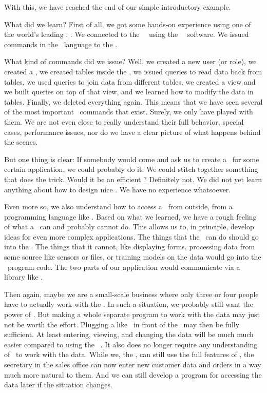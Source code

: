%
%
%
With this, we have reached the end of our simple introductory example.

What did we learn?
First of all, we got some hands-on experience using one of the world's leading \dbms, \postgresql.
We connected to the \postgresql\ \server\ using the \psql\ \client\ software.
We issued commands in the \sql\ language to the \dbms.

What kind of commands did we issue?
Well, we created a new user (or role), we created a \db, we created tables inside the \db, we issued queries to read data back from tables, we used queries to join data from different tables, we created a view and we built queries on top of that view, and we learned how to modify the data in tables.
Finally, we deleted everything again.
This means that we have seen several of the most important \sql\ commands that exist.
Surely, we only have played with them.
We are not even close to really understand their full behavior, special cases, performance issues, nor do we have a clear picture of what happens behind the scenes.

But one thing is clear:
If somebody would come and ask us to create a \db\ for some certain application, we could probably do it.
We could stitch together something that does the trick.
Would it be an efficient \db?
Definitely not.
We did not yet learn anything about how to design nice \dbs.
We have no experience whatsoever.

Even more so, we also understand how to access a \db\ from outside, from a programming language like \python.
Based on what we learned, we have a rough feeling of what a \dbms\ can and probably cannot do.
This allows us to, in principle, develop ideas for even more complex applications.
The things that the \dbms\ can do should go into the \db.
The things that it cannot, like displaying forms, processing data from some source like sensors or files, or training  models on the data would go into the \python\ program code.
The two parts of our application would communicate via a library like \psycopg.

Then again, maybe we are a small-scale business where only three or four people have to actually work with the \db.
In such a situation, we probably still want the power of \postgresql.
But making a whole separate program to work with the data may just not be worth the effort.
Plugging a  like \libreofficeBase\ in front of the \db\ may then be fully sufficient.
At least entering, viewing, and changing the data will be much much easier compared to using the \psql\ \client.
It also does no longer require any understanding of \sql\ to work with the data.
While we, the , can still use the full features of \postgresql, the secretary in the sales office can now enter new customer data and orders in a way much more natural to them.
And we can still develop a program for accessing the data later if the situation changes.

